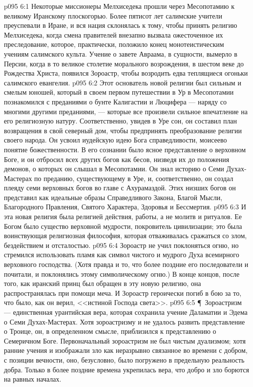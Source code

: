 \vs p095 6:1 Некоторые миссионеры Мелхиседека прошли через Месопотамию к великому Иранскому плоскогорью. Более пятисот лет салимские учители преуспевали в Иране, и вся нация склонялась к тому, чтобы принять религию Мелхиседека, когда смена правителей внезапно вызвала ожесточенное их преследование, которое, практически, положило конец монотеистическим учениям салимского культа. Учение о завете Авраама, в сущности, вымерло в Персии, когда в то великое столетие морального возрождения, в шестом веке до Рождества Христа, появился Зороастр, чтобы возродить едва теплящиеся огоньки салимского евангелия.
\vs p095 6:2 Этот основатель новой религии был сильным и смелым юношей, который в своем первом путешествии в Ур в Месопотамии познакомился с преданиями о бунте Калигастии и Люцифера --- наряду со многими другими преданиями, --- которые все произвели сильное впечатление на его религиозную натуру. Соответственно, увидев в Уре сон, он составил план возвращения в свой северный дом, чтобы предпринять преобразование религии своего народа. Он усвоил иудейскую идею Бога справедливости, моисеево понятие божественности. В его сознании было ясное представление о верховном Боге, и он отбросил всех других богов как бесов, низведя их до положения демонов, о которых он слышал в Месопотамии. Он знал историю о Семи Духах\hyp{}Мастерах по преданию, существующему в Уре, и, соответственно, он создал плеяду семи верховных богов во главе с Ахурамаздой. Этих низших богов он представил как идеальные образы Справедливого Закона, Благой Мысли, Благородного Правления, Святого Характера, Здоровья и Бессмертия.
\vs p095 6:3 И эта новая религия была религией действия, работы, а не молитв и ритуалов. Ее Богом было существо верховной мудрости, покровитель цивилизации; это была воинствующая религиозная философия, которая отваживалась сражаться со злом, бездействием и отсталостью.
\vs p095 6:4 Зороастр не учил поклоняться огню, но стремился использовать пламя как символ чистого и мудрого Духа всемирного верховного господства. (Хотя правда и то, что более поздние его последователи и почитали, и поклонялись этому символическому огню.) В конце концов, после того, как иранский принц был обращен в эту новую религию, она распространялась при помощи меча. И Зороастр героически погиб в бою за то, что было, как он верил, <<истиной Господа света>>.
\vs p095 6:5 \P\ Зороастризм --- единственная урантийская вера, которая сохранила учение Даламатии и Эдема о Семи Духах\hyp{}Мастерах. Хотя зороастризму и не удалось развить представление о Троице, он, в определенном смысле, приблизился к представлению о Семеричном Боге. Первоначальный зороастризм не был чистым дуализмом; хотя ранние учения и изображали зло как неразрывно связанное во времени с добром, с позиции вечности, оно, безусловно, было погружено в предельную реальность добра. Только в более поздние времена укрепилась вера, что добро и зло борются на равных началах.

